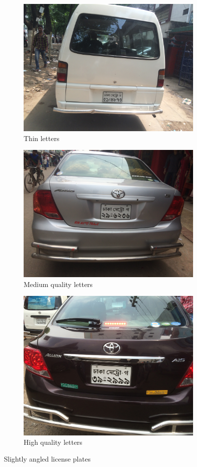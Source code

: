 \documentclass{standalone}
\begin{document}
\begin{figure}
\begin{subfigure}{0.5\textwidth}
    \centering
    \includegraphics[width=0.8\linewidth]{./img/experiment/stage.0/angle}
    \caption{Thin letters}
\end{subfigure}
\begin{subfigure}{0.5\textwidth}
    \centering
    \includegraphics[width=0.8\linewidth]{./img/experiment/stage.0/angle2}
    \caption{Medium quality letters}
\end{subfigure}
\begin{subfigure}{1.0\textwidth}
    \centering
    \includegraphics[width=0.8\linewidth]{./img/experiment/stage.0/angle3}
    \caption{High quality letters}
\end{subfigure}
\caption{Slightly angled license plates}
\label{fig:DataSamples1}
\end{figure}
\end{document}
